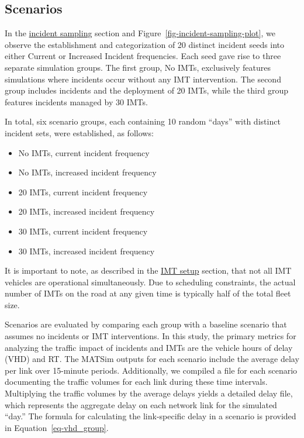 \documentclass[fancy, oneside, mastersfancy, ms]{byuthesis}
\providecommand{\tightlist}{%
  \setlength{\itemsep}{0pt}\setlength{\parskip}{0pt}}\usepackage{longtable,booktabs,array}
\begin{document}
\hypertarget{sec-scenarios}{%
\subsection{Scenarios}\label{sec-scenarios}}

In the \protect\hyperlink{sec-inc_data}{incident sampling} section and
Figure~\ref{fig-incident-sampling-plot}, we observe the establishment
and categorization of 20 distinct incident seeds into either Current or
Increased Incident frequencies. Each seed gave rise to three separate
simulation groups. The first group, No IMTs, exclusively features
simulations where incidents occur without any IMT intervention. The
second group includes incidents and the deployment of 20 IMTs, while the
third group features incidents managed by 30 IMTs.

In total, six scenario groups, each containing 10 random ``days'' with
distinct incident sets, were established, as follows:

\begin{itemize}
\tightlist
\item
  No IMTs, current incident frequency
\item
  No IMTs, increased incident frequency
\item
  20 IMTs, current incident frequency
\item
  20 IMTs, increased incident frequency
\item
  30 IMTs, current incident frequency
\item
  30 IMTs, increased incident frequency
\end{itemize}

It is important to note, as described in the
\protect\hyperlink{sec-IMT_setup}{IMT setup} section, that not all IMT
vehicles are operational simultaneously. Due to scheduling constraints,
the actual number of IMTs on the road at any given time is typically
half of the total fleet size.

Scenarios are evaluated by comparing each group with a baseline scenario
that assumes no incidents or IMT interventions. In this study, the
primary metrics for analyzing the traffic impact of incidents and IMTs
are the vehicle hours of delay (VHD) and RT. The MATSim outputs for each
scenario include the average delay per link over 15-minute periods.
Additionally, we compiled a file for each scenario documenting the
traffic volumes for each link during these time intervals. Multiplying
the traffic volumes by the average delays yields a detailed delay file,
which represents the aggregate delay on each network link for the
simulated ``day.'' The formula for calculating the link-specific delay
in a scenario is provided in Equation~\ref{eq-vhd_group}.
\end{document}

